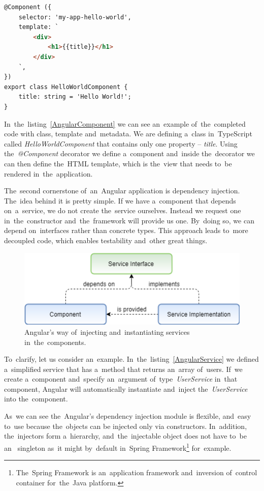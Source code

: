 \pagebreak
\begin{lstlisting}[caption=An Angular class with the~\textit{@Component}
decorator and~a~template., label=AngularComponent, language=HTML]
@Component ({
	selector: 'my-app-hello-world',
	template: `
		<div>
			<h1>{{title}}</h1>
		</div>
	`,
})
export class HelloWorldComponent {
	title: string = 'Hello World!';
}
\end{lstlisting}

In~the~listing~\ref{AngularComponent} we can see an~example of~the~completed
code with class, template and~metadata. We are defining a~class in~TypeScript
called \textit{HelloWorldComponent} that contains only one property --
\textit{title}. Using the~\textit{@Component} decorator we define a~component
and~inside the~decorator we can then define the~HTML template, which is the~view
that needs to~be rendered in~the~application.

The~second cornerstone of~an~Angular application is dependency injection.
The~idea behind it is pretty simple. If we have a~component that depends
on~a~service, we do not create the~service ourselves. Instead we request one
in~the~constructor and~the~framework will provide us one. By~doing so, we can
depend on~interfaces rather than concrete types. This approach leads to~more
decoupled code, which enables testability and~other great things.

\begin{figure}[!hbt]
	\centering
	\includegraphics[scale=0.65]{./obrazky-figures/DI.png}
	\caption{Angular's way of~injecting and~instantiating services
	in~the~components.}
	\label{DependencyInjection}
\end{figure}

To~clarify, let us consider an~example. In~the~listing~\ref{AngularService} we
defined a~simplified service that has a~method that returns an~array of~users.
If~we create a~component and~specify an~argument of~type~\textit{UserService}
in~that component, Angular will automatically instantiate and~inject
the~\textit{UserService} into the~component.

As~we can see the~Angular's dependency injection
module is flexible, and~easy to~use because the~objects can be injected only via
constructors. In~addition, the~injectors form a~hierarchy, and~the~injectable
object does not have to~be an~ singleton as~it might
by~default in~Spring Framework\footnote{The~Spring Framework is an~application
framework and~inversion of~control container for~the~Java platform.}
for~example.

